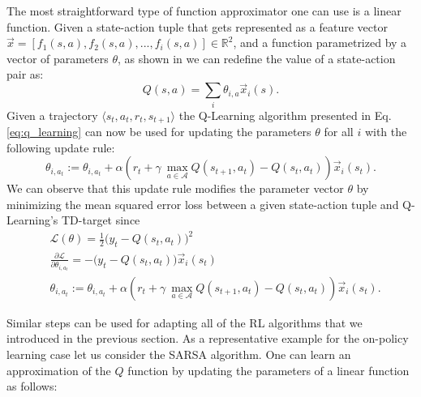 The most straightforward type of function approximator one can use is a linear function. Given a state-action tuple that gets represented as a feature vector $\vec{x}=[f_1(s,a), f_2(s,a), ..., f_i(s,a)] \in \mathds{R}^2$, and a function parametrized by a vector of parameters $\theta$, as shown in \cite{wiering2004convergence} we can redefine the value of a state-action pair as:
\begin{equation}
	Q(s,a) = \sum_i \theta_{i,a} \vec{x}_i(s).
\end{equation}
Given a trajectory $\langle s_t,a_t,r_t,s_{t+1}\rangle$ the Q-Learning algorithm presented in Eq. \ref{eq:q_learning} can now be used for updating the parameters $\theta$ for all $i$ with the following update rule:
\begin{equation}
	\theta_{i,a_t} := \theta_{i,a_t} + \alpha(r_t +\gamma\:\underset{a\in \mathcal{A}}{\max} Q(s_{t+1},a_t) - Q(s_t, a_t))\vec{x}_i(s_t).
	\label{eq:q_learning_fa}
\end{equation}
We can observe that this update rule modifies the parameter vector $\theta$ by minimizing the mean squared error loss between a given state-action tuple and Q-Learning's TD-target since  
\begin{equation}
\begin{split}
	& \mathcal{L}(\theta) = \frac{1}{2}\big(y_t - Q(s_t, a_t)\big)^2 \\ 
	& \frac{\partial\mathcal{L}}{\partial \theta_{i,a_t}}=-\big(y_t - Q(s_t, a_t)\big)\vec{x}_i(s_t)  \\ 
 	& \theta_{i,a_t} := \theta_{i,a_t} + \alpha(r_t +\gamma\:\underset{a\in \mathcal{A}}{\max} Q(s_{t+1},a_t) - Q(s_t, a_t))\vec{x}_i(s_t).
\end{split}
\end{equation}

Similar steps can be used for adapting all of the RL algorithms that we introduced in the previous section. As a representative example for the on-policy learning case let us consider the SARSA algorithm. One can learn an approximation of the $Q$ function by updating the parameters of a linear function as follows:

